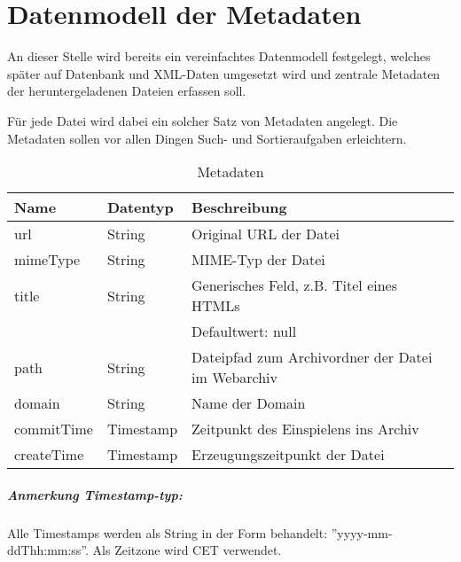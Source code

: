 \chapter{Datenmodell der Metadaten} \label{spec:model}
An dieser Stelle wird bereits ein vereinfachtes Datenmodell festgelegt, 
welches später auf Datenbank und XML-Daten umgesetzt wird und zentrale Metadaten 
der heruntergeladenen Dateien erfassen soll. 

Für jede Datei wird dabei ein solcher Satz von Metadaten angelegt.
Die Metadaten sollen vor allen Dingen Such- und Sortieraufgaben erleichtern. 

\begin{table}[h]
\centering
\begin{tabular}{|l|l|l|}	
	\hline
	Name 		& Datentyp 				& Beschreibung \\
	\hline
	url 		& String 				& Original URL der Datei\\
	\hline
	mimeType	& String 				& MIME-Typ der Datei\\
	\hline
	title 		& String 				& Generisches Feld, z.B. Titel eines HTMLs \\ 
				& 						& Defaultwert: null \\
	\hline
	path 		& String 				& Dateipfad zum Archivordner der Datei im Webarchiv \\
	\hline
	domain 		& String 				& Name der Domain \\
	\hline
	commitTime 	& Timestamp 			& Zeitpunkt des Einspielens ins Archiv \\
	\hline
	createTime 	& Timestamp 			& Erzeugungszeitpunkt der Datei \\
	\hline
\end{tabular}
\caption{Metadaten}
\end{table}

\paragraph{Anmerkung Timestamp-typ:}
Alle Timestamps werden als String in der Form behandelt:
''yyyy-mm-ddThh:mm:ss''. Als Zeitzone wird CET verwendet.

